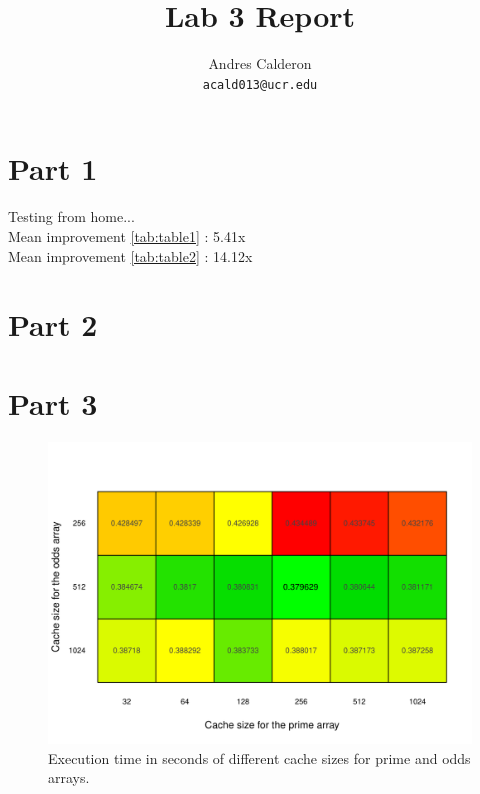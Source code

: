\documentclass[10pt]{scrartcl}
\title{Lab 3 Report}
\author{
   Andres Calderon\\
  \small \texttt{acald013@ucr.edu}
}
\begin{document}
\maketitle

\section{Part 1}
Testing from home... \\
Mean improvement \ref{tab:table1} : 5.41x \\
Mean improvement \ref{tab:table2} : 14.12x
\section{Part 2}



\section{Part 3}

\begin{figure}
  \centering
  \includegraphics[width=\textwidth]{cache}
  \caption{Execution time in seconds of different cache sizes for prime and odds arrays.}\label{fig:cache}
\end{figure}
\end{document}
